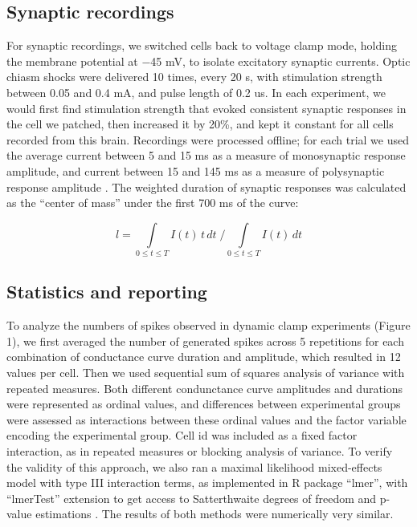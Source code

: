 \documentclass{article}
\begin{document}
\subsection*{Synaptic recordings}

For synaptic recordings, we switched cells back to voltage clamp mode, holding the membrane potential at $-$45 mV, to isolate excitatory synaptic currents. Optic chiasm shocks were delivered 10 times, every 20 s, with stimulation strength between 0.05 and 0.4 mA, and pulse length of 0.2 us. In each experiment, we would first find stimulation strength that evoked consistent synaptic responses in the cell we patched, then increased it by 20\%, and kept it constant for all cells recorded from this brain. Recordings were processed offline; for each trial we used the average current between 5 and 15 ms as a measure of monosynaptic response amplitude, and current between 15 and 145 ms as a measure of polysynaptic response amplitude \citep{ciarleglio2015}. The weighted duration of synaptic responses was calculated as the “center of mass” under the first 700 ms of the curve:

$$\displaystyle l=\int\limits_{0 \leq t \leq T}{I(t)\, t \, dt} \; \Big/ \int\limits_{0 \leq t \leq T}{I(t) \, dt}$$

\subsection*{Statistics and reporting}

To analyze the numbers of spikes observed in dynamic clamp experiments (Figure 1), we first averaged the number of generated spikes across 5 repetitions for each combination of conductance curve duration and amplitude, which resulted in 12 values per cell. Then we used sequential sum of squares analysis of variance with repeated measures. Both different condunctance curve amplitudes and durations were represented as ordinal values, and differences between experimental groups were assessed as interactions between these ordinal values and the factor variable encoding the experimental group. Cell id was included as a fixed factor interaction, as in repeated measures or blocking analysis of variance. To verify the validity of this approach, we also ran a maximal likelihood mixed-effects model with type III interaction terms, as implemented in R package “lmer”, with “lmerTest” extension to get access to Satterthwaite degrees of freedom and p-value estimations \citep{kuznetsova2017}. The results of both methods were numerically very similar.
\end{document}
